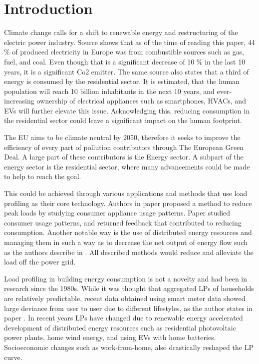 \chapter{Introduction}
\label{chapter1}

Climate change calls for a shift to renewable energy and restructuring of the electric power industry.
Source \cite{eurostat2020} shows that as of the time of reading this paper, 44 \% of produced electricity in Europe was from combustible sources such as gas, fuel, and coal. Even 
though that is a significant decrease of 10 \% in the last 10 years, it is a significant Co2 emitter.
The same source \cite{eurostat2020} also states that a third of energy is consumed by the residential sector. It is estimated, 
that the human population will reach 10 billion inhabitants in the next 10 years, and ever-increasing ownership of electrical appliances such as smartphones, HVACs, and EVs will further elevate this issue.
Acknowledging this, reducing consumption in the residential sector could leave a significant impact on the human footprint. 


The EU aims to be climate neutral by 2050, therefore it seeks to improve the efficiency of every part of pollution contributors through The European Green Deal.
A large part of these contributors is the Energy sector.
A subpart of the energy sector is the residential sector, where many advancements could be made to help to reach the goal.  

This could be achieved through various applications and methods that use load profiling as their core technology.
Authors in paper \cite{Chuan2014} proposed a method to reduce peak loads by studying consumer
appliance usage patterns. Paper \cite{Csoknyai2019} studied consumer usage patterns, and returned feedback that contributed to reducing consumption.
Another notable way is the use of distributed energy resources and managing them in such a way as to decrease the net output of energy flow such as the authors describe in
\cite{MORENOJARAMILLO2021445}. All described methods would reduce and alleviate the load off the power grid.

Load profiling in building energy consumption is not a novelty and had been in research since the 1980s.
While it was thought that aggregated LPs of households are relatively predictable, recent data obtained using smart meter data showed large deviance from user to user due to different lifestyles, as the author states in paper \cite{Review2021}.
In recent years LPs have changed due to renewable energy accelerated development of distributed energy resources such as residential photovoltaic
power plants, home wind energy, and using EVs with home batteries. Socioeconomic changes such as work-from-home, also drastically reshaped the LP curve. 

